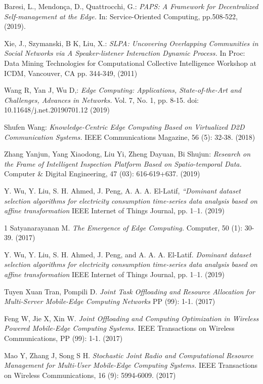 \begin{thebibliography}{9}
        Baresi, L., Mendonça, D., Quattrocchi, G.: 
        \textit{PAPS: A Framework for Decentralized Self-management at the Edge.}
        In: Service-Oriented Computing, pp.508-522, (2019).   

        Xie, J., Szymanski, B K, Liu, X.:
        \textit{SLPA: Uncovering Overlapping Communities in Social Networks via
        A Speaker-listener Interaction Dynamic Process.}
        In Proc: Data Mining Technologies for Computational Collective 
        Intelligence Workshop at ICDM, Vancouver, CA pp. 344-349, (2011)

        Wang R, Yan J, Wu D,:
        \textit{Edge Computing: Applications, State-of-the-Art and Challenges, Advances in Networks.}
        Vol. 7, No. 1, pp. 8-15. doi: 10.11648/j.net.20190701.12 (2019)

        Shufen Wang:
        \textit{Knowledge-Centric Edge Computing Based on Virtualized D2D Communication Systems.}
        IEEE Communications Magazine, 56 (5): 32-38. (2018)

        Zhang Yanjun, Yang Xiaodong, Liu Yi, Zheng Dayuan, Bi Shujun:
        \textit{Research on the Frame of Intelligent Inspection Platform Based on Spatio-temporal Data.}
        Computer \& Digital Engineering, 47 (03): 616-619+637. (2019)

        Y. Wu, Y. Liu, S. H. Ahmed, J. Peng, A. A. A. El-Latif,
        \textit{“Dominant dataset selection algorithms for electricity consumption time-series data analysis based on affine transformation}
        IEEE Internet of Things Journal, pp. 1–1. (2019)

    1   Satyanarayanan M. 
        \textit{The Emergence of Edge Computing.}
        Computer, 50 (1): 30-39. (2017)

        Y. Wu, Y. Liu, S. H. Ahmed, J. Peng, and A. A. A. El-Latif.
        \textit{Dominant dataset selection algorithms for electricity consumption time-series data analysis based on affine transformation} 
        IEEE Internet of Things Journal, pp. 1–1. (2019)
    
        Tuyen Xuan Tran, Pompili D.
        \textit{Joint Task Offloading and Resource Allocation for Multi-Server Mobile-Edge Computing Networks} PP (99): 1-1. (2017)

        Feng W, Jie X, Xin W.
        \textit{Joint Offloading and Computing Optimization in Wireless Powered Mobile-Edge Computing Systems.} 
        IEEE Transactions on Wireless Communications, PP (99): 1-1. (2017)

        Mao Y, Zhang J, Song S H.
        \textit{Stochastic Joint Radio and Computational Resource Management for Multi-User Mobile-Edge Computing Systems.} 
        IEEE Transactions on Wireless Communications, 16 (9): 5994-6009. (2017)

\end{thebibliography}